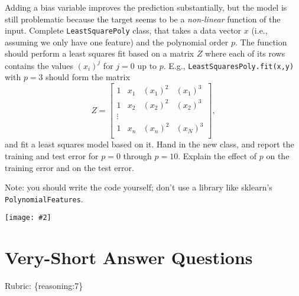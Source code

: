 \documentclass{article}
\def\rubric#1{\gre{Rubric: \{#1\}}}{}
\def\blu#1{{\color{blu}#1}}
\def\gre#1{{\color{gre}#1}}
\newcommand{\centerfig}[2]{\begin{center}\texttt{[image: \#2]}\end{center}}
\begin{document}
Adding a bias variable improves the prediction substantially, but the model is still problematic because the target seems to be a \emph{non-linear} function of the input.
Complete \texttt{LeastSquarePoly} class, that takes a data vector $x$ (i.e., assuming we only have one feature) and the polynomial order $p$. The function should perform a least squares fit based on a matrix $Z$ where each of its rows contains the values $(x_{i})^j$ for $j=0$ up to $p$. E.g., \texttt{LeastSquaresPoly.fit(x,y)}  with $p = 3$ should form the matrix
\[
Z =
\left[\begin{array}{cccc}
1 & x_1 & (x_1)^2 & (x_1)^3\\
1 & x_2 & (x_2)^2 & (x_2)^3\\
\vdots\\
1 & x_n & (x_n)^2 & (x_N)^3\\
\end{array}
\right],
\]
and fit a least squares model based on it.
\blu{Hand in the new class, and report the training and test error for $p = 0$ through $p= 10$. Explain the effect of $p$ on the training error and on the test error.}

Note: you should write the code yourself; don't use a library like sklearn's \texttt{PolynomialFeatures}.

\begin{center}
    
\end{center}

\centerfig{1}{../figs/least_squares_poly.pdf}


\section{Very-Short Answer Questions}
\rubric{reasoning:7}
\end{document}
